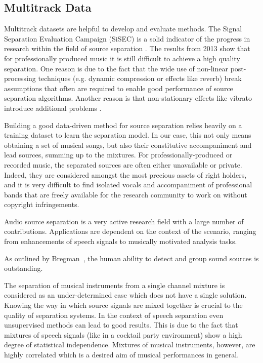 \subsection{Multitrack Data}

Multitrack datasets are helpful to develop and evaluate methods.
The Signal Separation Evaluation Campaign (SiSEC) is a solid indicator of the progress in research within the field of source separation \cite{vincent12}. The results from 2013 \cite{sisec13} show that for professionally produced music it is still difficult to achieve a high quality separation.
One reason is due to the fact that the wide use of non-linear post-processing techniques (e.g. dynamic compression or effects like reverb) break assumptions that often are required to enable good performance of source separation algorithms. Another reason is that non-stationary effects like vibrato introduce additional problems \cite{nakano10}.

Building a good data-driven method for source separation relies heavily on a training dataset to learn the separation model. In our case, this not only means obtaining a set of musical songs, but also their constitutive accompaniment and lead sources, summing up to the mixtures. For professionally-produced or recorded music, the separated sources are often either unavailable or private. Indeed, they are considered amongst the most precious assets of right holders, and it is very difficult to find isolated vocals and accompaniment of professional bands that are freely available for the research community to work on without copyright infringements.

Audio source separation is a very active research field with a large number of contributions. Applications are dependent on the context of the scenario, ranging from enhancements of speech signals to musically motivated analysis tasks.

As outlined by Bregman~\cite{bregman94}, the human ability to detect and group sound sources is outstanding.

The separation of musical instruments from a single channel mixture is considered as an under-determined case which does not have a single solution. Knowing the way in which source signals are mixed together is crucial to the quality of separation systems. In the context of speech separation even unsupervised methods can lead to good results. This is due to the fact that mixtures of speech signals (like in a cocktail party environment) show a high degree of statistical independence. Mixtures of musical instruments, however, are highly correlated which is a desired aim of musical performances in general.

